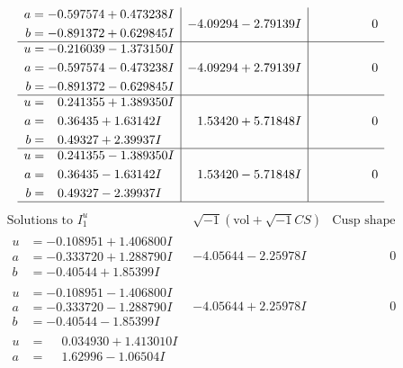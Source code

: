 \documentclass[1p]{elsarticle_modified}
\theoremstyle{definition}
\newcommand{\I}{\sqrt{-1}}
\begin{document}
$$\begin{array}{c|c|c}
\begin{aligned}
a &= -0.597574 + 0.473238 I \\
b &= -0.891372 + 0.629845 I\end{aligned}
 & -4.09294 - 2.79139 I & \phantom{-0.000000 } 0 \\ \hline\begin{aligned}
u &= -0.216039 - 1.373150 I \\
a &= -0.597574 - 0.473238 I \\
b &= -0.891372 - 0.629845 I\end{aligned}
 & -4.09294 + 2.79139 I & \phantom{-0.000000 } 0 \\ \hline\begin{aligned}
u &= \phantom{-}0.241355 + 1.389350 I \\
a &= \phantom{-}0.36435 + 1.63142 I \\
b &= \phantom{-}0.49327 + 2.39937 I\end{aligned}
 & \phantom{-}1.53420 + 5.71848 I & \phantom{-0.000000 } 0 \\ \hline\begin{aligned}
u &= \phantom{-}0.241355 - 1.389350 I \\
a &= \phantom{-}0.36435 - 1.63142 I \\
b &= \phantom{-}0.49327 - 2.39937 I\end{aligned}
 & \phantom{-}1.53420 - 5.71848 I & \phantom{-0.000000 } 0\\
 \hline 
 \end{array}$$\newpage$$\begin{array}{c|c|c}  
\text{Solutions to }I^u_{1}& \I (\text{vol} + \sqrt{-1}CS) & \text{Cusp shape}\\
 \hline 
\begin{aligned}
u &= -0.108951 + 1.406800 I \\
a &= -0.333720 + 1.288790 I \\
b &= -0.40544 + 1.85399 I\end{aligned}
 & -4.05644 - 2.25978 I & \phantom{-0.000000 } 0 \\ \hline\begin{aligned}
u &= -0.108951 - 1.406800 I \\
a &= -0.333720 - 1.288790 I \\
b &= -0.40544 - 1.85399 I\end{aligned}
 & -4.05644 + 2.25978 I & \phantom{-0.000000 } 0 \\ \hline\begin{aligned}
u &= \phantom{-}0.034930 + 1.413010 I \\
a &= \phantom{-}1.62996 - 1.06504 I \\

\end{aligned}
\end{array}$$
\end{document}

